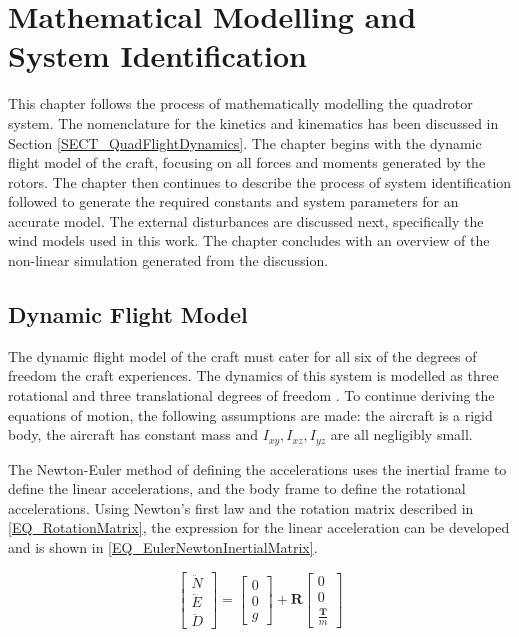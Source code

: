 \chapter{Mathematical Modelling and System Identification}
This chapter follows the process of mathematically modelling the quadrotor system. The nomenclature for the kinetics and kinematics has been discussed in Section \ref{SECT_QuadFlightDynamics}. The chapter begins with the dynamic flight model of the craft, focusing on all forces and moments generated by the rotors. The chapter then continues to describe the process of system identification followed to generate the required constants and system parameters for an accurate model. The external disturbances are discussed next, specifically the wind models used in this work. The chapter concludes with an overview of the non-linear simulation generated from the discussion.
	
\section{Dynamic Flight Model}\label{SSECT_DynamicFLightModel}
The dynamic flight model of the craft must cater for all six of the degrees of freedom the craft experiences. The dynamics of this system is modelled as three rotational and three translational degrees of freedom \cite{Moller2015}. To continue deriving the equations of motion, the following assumptions are made: the aircraft is a rigid body, the aircraft has constant mass and $I_{xy}, I_{xz}, I_{yz}$ are all negligibly small.   

The Newton-Euler method of defining the accelerations uses the inertial frame to define the linear accelerations, and the body frame to define the rotational accelerations. Using Newton's first law and the rotation matrix described in \eqref{EQ_RotationMatrix}, the expression for the linear acceleration can be developed and is shown in \eqref{EQ_EulerNewtonInertialMatrix}.

\begin{equation}
\begin{bmatrix} \ddot{N}\\ \ddot{E}\\ \ddot{D} \end{bmatrix} = \begin{bmatrix} 0\\ 0\\ g \end{bmatrix} + \textbf{R} \begin{bmatrix} 0\\ 0\\ \frac{\textbf{T}}{m} \end{bmatrix}
\label{EQ_EulerNewtonInertialMatrix}
\end{equation}

